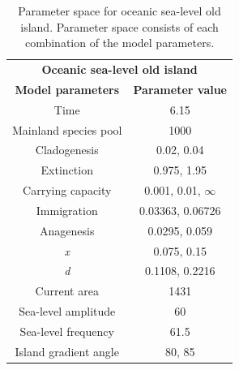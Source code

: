 \begin{table}[ht]
    \centering
    \caption{Parameter space for oceanic sea-level old island. Parameter space consists of each combination of the model parameters.}
    \begin{tabular}{ c | c }
        \multicolumn{2}{c}{\textbf{Oceanic sea-level old island}} \\
        \textbf{Model parameters} & \textbf{Parameter value} \\ 
        \hline
        \hline
        Time & 6.15 \\
        \hline
        Mainland species pool & 1000 \\
        \hline
        Cladogenesis & 0.02, 0.04 \\
        \hline
        Extinction & 0.975, 1.95 \\
        \hline
        Carrying capacity & 0.001, 0.01, $\infty$ \\
        \hline
        Immigration & 0.03363, 0.06726 \\
        \hline
        Anagenesis & 0.0295, 0.059 \\
        \hline
        \textit{x} & 0.075, 0.15 \\
        \hline
        \textit{d} & 0.1108, 0.2216 \\
        \hline
        Current area & 1431 \\
        \hline
        Sea-level amplitude & 60 \\
        \hline
        Sea-level frequency & 61.5 \\
        \hline
        Island gradient angle & 80, 85 \\
    \end{tabular}
    \label{tab:oceanic_sea_level_old}
\end{table}


